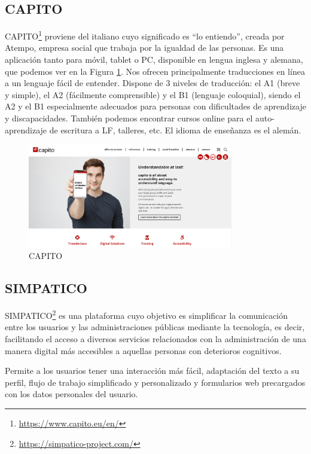 \subsection{CAPITO }

CAPITO\footnote{\href{https://www.capito.eu/en/}{https://www.capito.eu/en/}} proviene del italiano cuyo significado es ``lo entiendo'', creada por Atempo, empresa social que trabaja por la igualdad de las personas. Es una aplicación tanto para móvil, tablet o PC, disponible en lengua inglesa y alemana, que podemos ver en la Figura \ref{fig:capito}. Nos ofrecen principalmente traducciones en línea a un lenguaje fácil de entender. Dispone de 3 niveles de traducción: el A1 (breve y simple), el A2 (fácilmente comprensible) y el B1 (lenguaje coloquial), siendo el A2 y el B1 especialmente adecuados para personas con dificultades de aprendizaje y discapacidades. 
También podemos encontrar cursos online para el auto-aprendizaje de escritura a LF, talleres, etc. El idioma de enseñanza es el alemán.
\begin{figure}[h]
	\centering
	\includegraphics[width=0.8\textwidth]{Imagenes/ProyectosMateriales/capito}
	\caption{CAPITO}
	\label{fig:capito}
\end{figure} 


\subsection{SIMPATICO }

SIMPATICO\footnote{\href{https://simpatico-project.com/}{https://simpatico-project.com/}} es una plataforma cuyo objetivo es simplificar la comunicación entre los usuarios y las administraciones públicas mediante la tecnología, es decir, facilitando el acceso a diversos servicios relacionados con la administración de una manera digital más accesibles a aquellas personas con deterioros cognitivos.

 Permite a los usuarios tener una interacción más fácil, adaptación del texto a su perfil, flujo de trabajo simplificado y personalizado y formularios web precargados con los datos personales del usuario.
 
